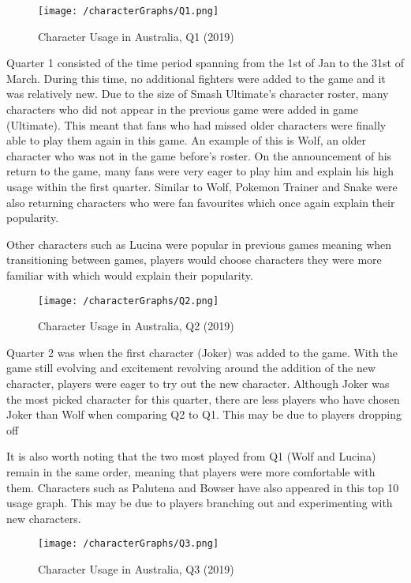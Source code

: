 \documentclass[11pt, oneside, a4paper]{article}
\begin{document}
\begin{figure}[!ht]
	\centerline{\texttt{[image: /characterGraphs/Q1.png]}}
	\caption{Character Usage in Australia, Q1 (2019)}
	\label{fig:figure2}
\end{figure}

Quarter 1 consisted of the time period spanning from the 1st of Jan to the 31st of March. During this time, no additional fighters were added to the game and it was relatively new. Due to the size of Smash Ultimate's character roster, many characters who did not appear in the previous game were added in game (Ultimate). This meant that fans who had missed older characters were finally able to play them again in this game. An example of this is Wolf, an older character who was not in the game before's roster. On the announcement of his return to the game, many fans were very eager to play him and explain his high usage within the first quarter. Similar to Wolf, Pokemon Trainer and Snake were also returning characters who were fan favourites which once again explain their popularity. 

Other characters such as Lucina were popular in previous games meaning when transitioning between games, players would choose characters they were more familiar with which would explain their popularity.

\newpage
\begin{figure}[!ht]
	\centerline{\texttt{[image: /characterGraphs/Q2.png]}}
	\caption{Character Usage in Australia, Q2 (2019)}
	\label{fig:figure2}
\end{figure}

Quarter 2 was when the first character (Joker) was added to the game. With the game still evolving and excitement revolving around the addition of the new character, players were eager to try out the new character. Although Joker was the most picked character for this quarter, there are less players who have chosen Joker than Wolf when comparing Q2 to Q1. This may be due to players dropping off

It is also worth noting that the two most played from Q1 (Wolf and Lucina) remain in the same order, meaning that players were more comfortable with them. Characters such as Palutena and Bowser have also appeared in this top 10 usage graph. This may be due to players branching out and experimenting with new characters.

\begin{figure}[!ht]
	\centerline{\texttt{[image: /characterGraphs/Q3.png]}}
	\caption{Character Usage in Australia, Q3 (2019)}
	\label{fig:figure2}
\end{figure}
\end{document}
